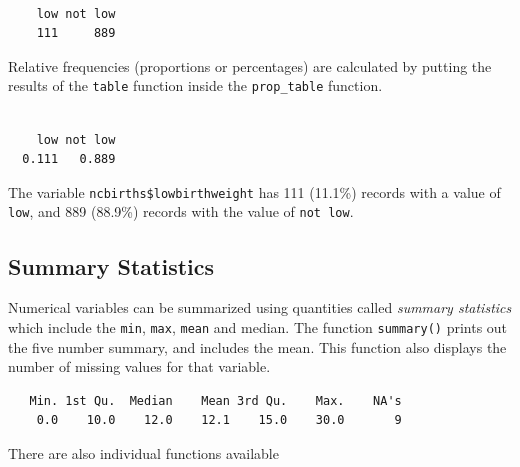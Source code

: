 \documentclass[
  letterpaper,
  DIV=11,
  numbers=noendperiod,
  oneside]{scrreprt}
\newenvironment{Shaded}{\begin{snugshade}}{\end{snugshade}}
\newcommand{\FunctionTok}[1]{\textcolor[rgb]{0.28,0.35,0.67}{#1}}
\newcommand{\NormalTok}[1]{\textcolor[rgb]{0.00,0.23,0.31}{#1}}
\newcommand{\SpecialCharTok}[1]{\textcolor[rgb]{0.37,0.37,0.37}{#1}}
\begin{document}
\begin{verbatim}

    low not low 
    111     889 
\end{verbatim}

Relative frequencies (proportions or percentages) are calculated by
putting the results of the \texttt{table} function inside the
\texttt{prop\_table} function.

\begin{Shaded}
\end{Shaded}

\begin{verbatim}

    low not low 
  0.111   0.889 
\end{verbatim}

The variable \texttt{ncbirths\$lowbirthweight} has 111 (11.1\%) records
with a value of \texttt{low}, and 889 (88.9\%) records with the value of
\texttt{not\ low}.

\subsection{Summary Statistics}\label{summary-statistics}

Numerical variables can be summarized using quantities called
\emph{summary statistics} which include the \texttt{min}, \texttt{max},
\texttt{mean} and median. The function \texttt{summary()} prints out the
five number summary, and includes the mean. This function also displays
the number of missing values for that variable.

\begin{Shaded}
\end{Shaded}

\begin{verbatim}
   Min. 1st Qu.  Median    Mean 3rd Qu.    Max.    NA's 
    0.0    10.0    12.0    12.1    15.0    30.0       9 
\end{verbatim}

There are also individual functions available
\end{document}

